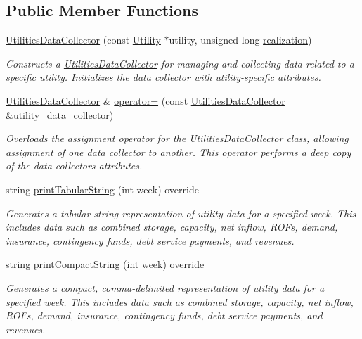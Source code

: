 \subsection*{Public Member Functions}
\begin{DoxyCompactItemize}
\item 
\mbox{\hyperlink{classUtilitiesDataCollector_a7aee55a1cbd0fcdca59339a9e78ed08b}{Utilities\+Data\+Collector}} (const \mbox{\hyperlink{classUtility}{Utility}} $\ast$utility, unsigned long \mbox{\hyperlink{classDataCollector_a9ef2887466fe3123aa19ef956a219b96}{realization}})
\begin{DoxyCompactList}\small\item\em Constructs a {\ttfamily \mbox{\hyperlink{classUtilitiesDataCollector}{Utilities\+Data\+Collector}}} for managing and collecting data related to a specific utility. Initializes the data collector with utility-\/specific attributes. \end{DoxyCompactList}\item 
\mbox{\hyperlink{classUtilitiesDataCollector}{Utilities\+Data\+Collector}} \& \mbox{\hyperlink{classUtilitiesDataCollector_a805182c7f423290135a5c92844cdbb4a}{operator=}} (const \mbox{\hyperlink{classUtilitiesDataCollector}{Utilities\+Data\+Collector}} \&utility\+\_\+data\+\_\+collector)
\begin{DoxyCompactList}\small\item\em Overloads the assignment operator for the {\ttfamily \mbox{\hyperlink{classUtilitiesDataCollector}{Utilities\+Data\+Collector}}} class, allowing assignment of one data collector to another. This operator performs a deep copy of the data collector\textquotesingle{}s attributes. \end{DoxyCompactList}\item 
string \mbox{\hyperlink{classUtilitiesDataCollector_a39e7d28a70a0f71b3f1cc28b19c7e2d9}{print\+Tabular\+String}} (int week) override
\begin{DoxyCompactList}\small\item\em Generates a tabular string representation of utility data for a specified week. This includes data such as combined storage, capacity, net inflow, R\+O\+Fs, demand, insurance, contingency funds, debt service payments, and revenues. \end{DoxyCompactList}\item 
string \mbox{\hyperlink{classUtilitiesDataCollector_a57b5f9cd8ddf54154476749ab0977355}{print\+Compact\+String}} (int week) override
\begin{DoxyCompactList}\small\item\em Generates a compact, comma-\/delimited representation of utility data for a specified week. This includes data such as combined storage, capacity, net inflow, R\+O\+Fs, demand, insurance, contingency funds, debt service payments, and revenues. \end{DoxyCompactList}\item 

\end{DoxyCompactItemize}
